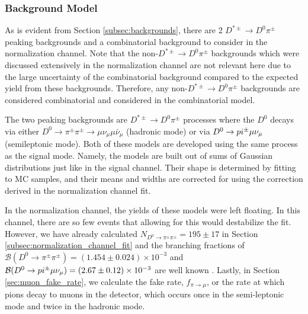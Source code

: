 \subsubsection{Background Model}

As is evident from Section \ref{subsec:backgrounds}, there are 2 $D^{*\pm} \to D^0 \pi^\pm$ peaking backgrounds and a combinatorial background to consider in the normalization channel. Note that the non-$D^{*\pm} \to D^0 \pi^\pm$ backgrounds which were discussed extensively in the normalization channel are not relevant here due to the large uncertainty of the combinatorial background compared to the expected yield from these backgrounds. Therefore, any non-$D^{*\pm} \to D^0 \pi^\pm$ backgrounds are considered combinatorial and considered in the combinatorial model.

The two peaking backgrounds are $D^{*\pm} \to D^0 \pi^\pm$ processes where the $D^0$ decays via either $D^0 \to \pi^\pm \pi^\pm \to \mu \nu_\mu \mu \bar{\nu}_\mu$ (hadronic mode) or via $D^0 \to \\pi^\pm \mu \nu_\mu$ (semileptonic mode). Both of these models are developed using the same process as the signal mode. Namely, the models are built out of sums of Gaussian distributions just like in the signal channel. Their shape is determined by fitting to MC samples, and their means and widths are corrected for using the correction derived in the normalization channel fit. 

In the normalization channel, the yields of these models were left floating. In this channel, there are so few events that allowing for this would destabilize the fit. However, we have already calculated $N_{D^0 \to \pi^\pm \pi^\pm} = 195 \pm 17$ in Section \ref{subsec:normalization_channel_fit} and the branching fractions of $\mathcal{B}(D^0 \to \pi^\pm \pi^\pm) = (1.454 \pm 0.024) \times 10^{-3}$ and $\mathcal{B}(D^0 \to \\pi^\pm\mu \nu_\mu) = (2.67 \pm 0.12) \times 10^{-3}$ are well known \cite{ref:pdg2024}. Lastly, in Section \ref{sec:muon_fake_rate}, we calculate the fake rate, $f_{\pi \to \mu}$, or the rate at which pions decay to muons in the detector, which occurs once in the semi-leptonic mode and twice in the hadronic mode.

